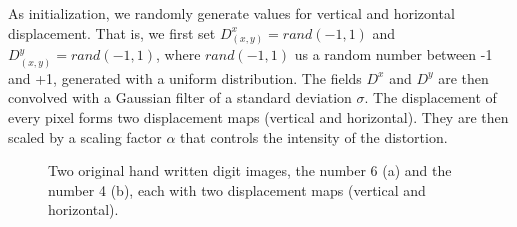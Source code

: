 As initialization, we randomly generate values for vertical and horizontal displacement. That is, we first set $D^x_{(x,y)}=rand(-1,1)$ and $D^y_{(x,y)}=rand(-1,1)$, where $rand(-1,1)$ us a random number between -1 and +1, generated with a uniform distribution. The fields $D^x$ and $D^y$ are then convolved with a Gaussian filter of a standard deviation $\sigma$. The displacement of every pixel forms two displacement maps (vertical and horizontal). They are then scaled by a scaling factor $\alpha$ that controls the intensity of the distortion.

\begin{figure}[t]
\centering
\label{elast1}
\caption{\label{elast2}Two original hand written digit images, the number 6 (a) and the number 4 (b), each with two displacement maps (vertical and horizontal).}
\vspace{-10pt}
\end{figure}




